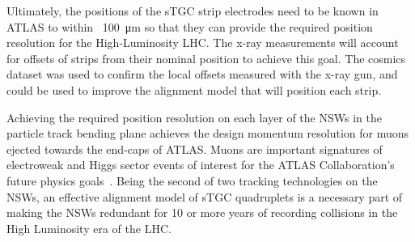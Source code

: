 Ultimately, the positions of the sTGC strip electrodes need to be known in ATLAS to within ~\SI{100}{\micro\meter} so that they can provide the required position resolution for the High-Luminosity LHC. The x-ray measurements will account for offsets of strips from their nominal position to achieve this goal. The cosmics dataset was used to confirm the local offsets measured with the x-ray gun, and could be used to improve the alignment model that will position each strip.

Achieving the required position resolution on each layer of the NSWs in the particle track bending plane achieves the design momentum resolution for muons ejected towards the end-caps of ATLAS. Muons are important signatures of electroweak and Higgs sector events of interest for the ATLAS Collaboration's future physics goals~\cite{nsw_tdr}. Being the second of two tracking technologies on the NSWs, an effective alignment model of sTGC quadruplets is a necessary part of making the NSWs redundant for 10 or more years of recording collisions in the High Luminosity era of the LHC. 